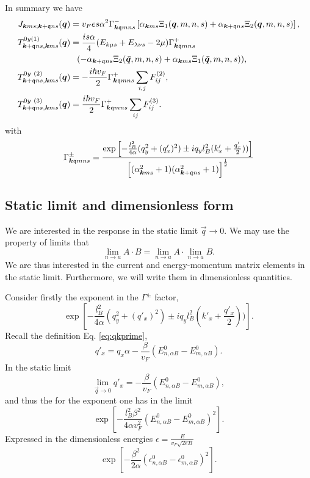 In summary we have
\begin{align}
  \label{eq:90}
  J_{\vec{k} m s; \vec{k} + \qvec{q} n s} (\vec{q}) &=
    v_{F} e s \alpha^2
    \Gamma ^-_{\vec{k} \qvec{q} m n s}
    \left[ \alpha _{\vec{k} m s} \Xi_{1} (\vec{q}, m, n, s)
      + \alpha _{\vec{k} + \qvec{q} n s} \Xi _{2} (\vec{q}, m, n, s) \right],\\
  T_{\vec{k} + \qvec{q} n s, \vec{k} m s}^{0y (1)} (\vec{q}) &=
  \frac{is \alpha}{4  }
  (E_{k\mu s} + E_{\lambda  \nu  s} - 2 \mu) \Gamma ^+_{\vec{k} \qvec{q} m n s} \\
  &\pe (- \alpha_{\vec{k}+ \qvec{q} n s} \Xi_{2} (\bar{\vec{q}}, m, n, s) + \alpha_{\vec{k} m s} \Xi_{1}(\bar{\vec{q}}, m, n, s)),\\
  T^{0y~(2)}_{\vec{k} + \qvec{q} ns, \vec{k} ms} (\vec{q})
&= -\frac{ i \hbar v_{F} }{2}
                                                                                     \Gamma _{\vec{k} \qvec{q} m n s}^+
                                                             \sum\limits_{i,j}^{} F^{(2)}_{ij},\\
  T^{0y~(3)}_{\vec{k} + \qvec{q} ns, \vec{k} ms} (\vec{q})
  &= \frac{i \hbar v_F}{2}
    \Gamma ^{+}_{\vec{k} \qvec{q} m n s}
    \sum\limits_{ij}^{} F^{(3)}_{ij}.
\end{align}
with
\[
  \Gamma _{\bm{k} \mathfrak{q} m n s}^{\pm} =
  \frac{
  \exp
  \left[
    - \frac{l_{B}^2}{4 \alpha } (q_{y}^2 + (q' _x)^2) \pm  i q_y l_B^2 (k' _x + \frac{q'_x}{2} )  )
  \right  ]
}{
  \left[(\alpha_{\bm{k} m s}^2 +1) (\alpha_{\bm{k} + \mathfrak{q} ns} ^2 + 1)\right]^{\frac{1}{2}}
}
\]

\subsection{Static limit and dimensionless form}
We are interested in the response in the static limit \( \vec{q} \to  0 \).
We may use the property of limits that
\[
  \lim_{n \to a} A \cdot  B = \lim_{n \to a} A \cdot \lim_{n \to a} B.
\]
We are thus interested in the current and energy-momentum matrix elements in the static limit.
Furthermore, we will write them in dimensionless quantities.

Consider firstly the exponent in the \( \Gamma ^{\pm } \) factor,
\[
  \exp
  \left[
    - \frac{l_{B}^2}{4 \alpha } (q_{y}^2 + (q' _x)^2) \pm  i q_y l_B^2 (k' _x + \frac{q'_x}{2} )  )
  \right].
\]
Recall the definition Eq. \eqref{eq:qkprime},
\begin{equation*}
  q' _x = q_x \alpha  - \frac{\beta}{v_{F} }( E^0_{n,\alpha B} - E^0_{m, \alpha B} ).
\end{equation*}
In the static limit
\[
  \lim_{\vec{q} \to 0} q'_x = - \frac{\beta}{v_{F}}( E^0_{n,\alpha B} - E^0_{m, \alpha B} ),
\]
and thus the for the exponent one has in the limit
\[
  \exp
  \left[
    - \frac{l_{B}^2 \beta ^2}{4 \alpha v_F^2} ( E^0_{n,\alpha B} - E^0_{m, \alpha B} )^2
  \right].
\]
Expressed in the dimensionless energies \( \epsilon = \frac{E}{v_{F} \sqrt{2 e B} } \)
\[
  \exp
  \left[
    - \frac{\beta ^2 }{2 \alpha} ( \epsilon ^0_{n,\alpha B} - \epsilon ^0_{m, \alpha B} )^2
  \right].
\]

